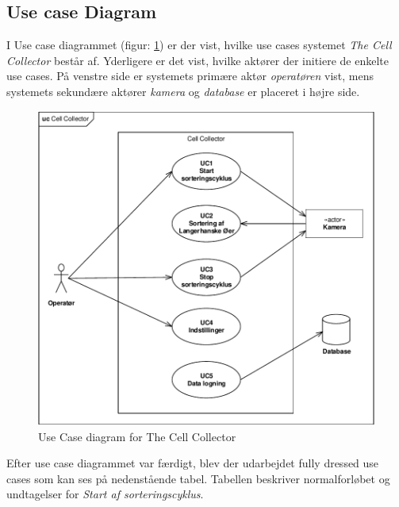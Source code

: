 \subsection{Use case Diagram}
I Use case diagrammet (figur: \ref{fig:usecase}) er der vist, hvilke use cases systemet \textit{The Cell Collector} består af. Yderligere er det vist, hvilke aktører der initiere de enkelte use cases. På venstre side er systemets primære aktør \textit{operatøren} vist, mens systemets sekundære aktører \textit{kamera} og \textit{database} er placeret i højre side. 

\begin{figure}[H]
	\centering
	\includegraphics[width=1\textwidth]{billeder/UC_CellCollector.pdf}
	\caption{Use Case diagram for The Cell Collector}
	\label{fig:usecase}
\end{figure}

Efter use case diagrammet var færdigt, blev der udarbejdet fully dressed use cases som kan ses på nedenstående tabel. Tabellen beskriver normalforløbet og undtagelser for \textit{Start af sorteringscyklus}. 

\newpage 
